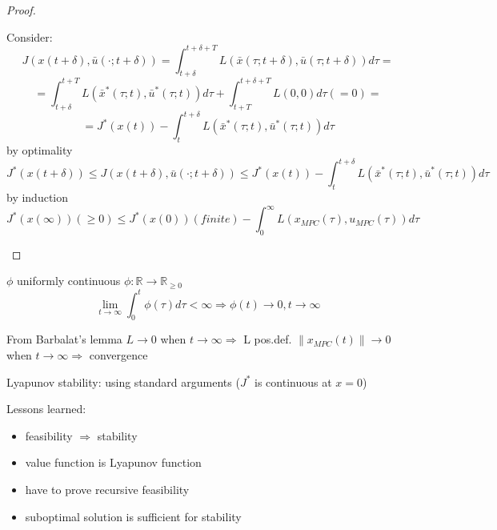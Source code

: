 \begin{Theorem}
\begin{proof}
\begin{enumerate}
Consider: 
\begin{equation*}
J(x(t+\delta), \bar u(\cdot;t+\delta)) = \int_{t+\delta}^{t+\delta + T} L(\bar x(\tau;t+\delta), \bar u(\tau; t+\delta))d\tau=
\end{equation*} 
\begin{equation*}
= \int_{t+\delta}^{t+T}L(\bar x^*(\tau;t), \bar u^*(\tau;t))d\tau + \int_{t+T}^{t+\delta+T}L(0,0)d\tau (=0) = 
\end{equation*}
\begin{equation*}
= J^*(x(t)) - \int_{t}^{t+\delta} L(\bar x^*(\tau;t), \bar u^*(\tau;t))d\tau
\end{equation*}
by optimality 
\begin{equation*}
J^*(x(t+\delta)) \leq J(x(t+\delta), \bar u(\cdot;t+\delta)) \leq J^*(x(t)) - \int_{t}^{t+\delta} L(\bar x^*(\tau;t), \bar u^*(\tau;t))d \tau
\end{equation*}
by induction
\begin{equation*}
J^*(x(\infty)) (\geq 0) \leq J^*(x(0)) (finite) - \int_0^{\infty}L(x_{MPC}(\tau), u_{MPC}(\tau))d\tau
\end{equation*}
\end{enumerate}
\end{proof}
\end{Theorem}

\begin{Lemma}

$\phi$ uniformly continuous $\phi: \mathbb{R} \to \mathbb{R}_{\geq 0}$
\begin{equation*}
\lim_{t \to \infty} \int_0^t \phi(\tau)d\tau < \infty \Rightarrow \phi(t)\to 0, t \to \infty
\end{equation*}
\end{Lemma}
From Barbalat's lemma
$L \to 0 $ when $t \to \infty \Rightarrow $ L pos.def. $\|x_{MPC}(t)\| \to 0$ when $t \to \infty \Rightarrow$ convergence

Lyapunov stability: using standard arguments ($J^*$ is continuous at $x=0$)

Lessons learned:
\begin{itemize}
\item feasibility $\Rightarrow$ stability
\item value function is Lyapunov function
\item have to prove recursive feasibility
\item suboptimal solution is sufficient for stability  
\end{itemize}

